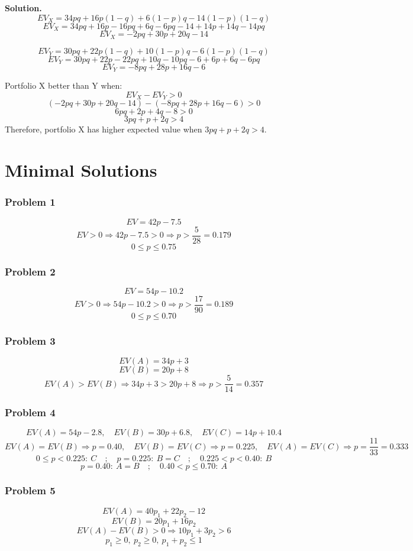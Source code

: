 \begin{ExamProblems}
		\textbf{Solution.}
		\[
		EV_X=34pq+16p(1-q)+6(1-p)q-14(1-p)(1-q)
		\]
		\[
		EV_X=34pq+16p-16pq+6q-6pq-14+14p+14q-14pq
		\]
		\[
		EV_X=-2pq+30p+20q-14
		\]
		
		\[
		EV_Y=30pq+22p(1-q)+10(1-p)q-6(1-p)(1-q)
		\]
		\[
		EV_Y=30pq+22p-22pq+10q-10pq-6+6p+6q-6pq
		\]
		\[
		EV_Y=-8pq+28p+16q-6
		\]
		
		Portfolio X better than Y when:
		\[
		EV_X-EV_Y>0
		\]
		\[
		(-2pq+30p+20q-14)-(-8pq+28p+16q-6)>0
		\]
		\[
		6pq+2p+4q-8>0
		\]
		\[
		3pq+p+2q>4
		\]
		Therefore, portfolio X has higher expected value when \(3pq+p+2q>4\).
		
	\end{ExamProblems}
	

\part{Minimal Solutions}
\section*{Problem 1}
\[
EV=42p-7.5
\]
\[
EV>0\Rightarrow 42p-7.5>0\Rightarrow p>\frac{5}{28}=0.179
\]
\[
0\le p\le0.75
\]

\section*{Problem 2}
\[
EV=54p-10.2
\]
\[
EV>0\Rightarrow 54p-10.2>0\Rightarrow p>\frac{17}{90}=0.189
\]
\[
0\le p\le0.70
\]

\section*{Problem 3}
\[
EV(A)=34p+3
\]
\[
EV(B)=20p+8
\]
\[
EV(A)>EV(B)\Rightarrow 34p+3>20p+8\Rightarrow p>\frac{5}{14}=0.357
\]

\section*{Problem 4}
\[
EV(A)=54p-2.8,\quad EV(B)=30p+6.8,\quad EV(C)=14p+10.4
\]
\[
EV(A)=EV(B)\Rightarrow p=0.40,\quad EV(B)=EV(C)\Rightarrow p=0.225,\quad EV(A)=EV(C)\Rightarrow p=\frac{11}{33}=0.333
\]
\[
0\le p<0.225:\ C\quad ;\quad p=0.225:\ B=C\quad ;\quad 0.225<p<0.40:\ B
\]
\[
p=0.40:\ A=B\quad ;\quad 0.40<p\le0.70:\ A
\]

\section*{Problem 5}
\[
EV(A)=40p_1+22p_2-12
\]
\[
EV(B)=20p_1+16p_2
\]
\[
EV(A)-EV(B)>0\Rightarrow 10p_1+3p_2>6
\]
\[
p_1\ge0,\ p_2\ge0,\ p_1+p_2\le1
\]

